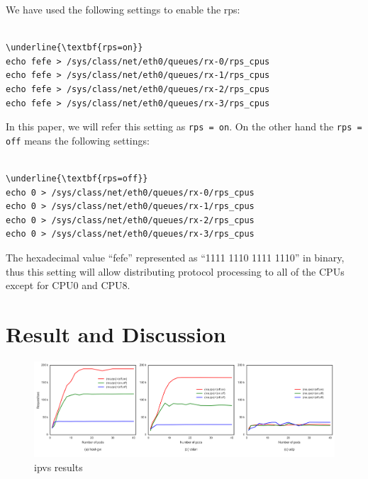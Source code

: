 We have used the following settings to enable the rps:

\begin{center}
\begin{minipage}{0.8\columnwidth}
\begin{Verbatim}[commandchars=\\\{\}]

\underline{\textbf{rps=on}}
echo fefe > /sys/class/net/eth0/queues/rx-0/rps_cpus
echo fefe > /sys/class/net/eth0/queues/rx-1/rps_cpus
echo fefe > /sys/class/net/eth0/queues/rx-2/rps_cpus
echo fefe > /sys/class/net/eth0/queues/rx-3/rps_cpus

\end{Verbatim}
\end{minipage}
\end{center}

In this paper, we will refer this setting as {\tt rps = on}.
On the other hand the {\tt rps = off} means the following settings:

\begin{center}
\begin{minipage}{0.8\columnwidth}
\begin{Verbatim}[commandchars=\\\{\}]

\underline{\textbf{rps=off}}
echo 0 > /sys/class/net/eth0/queues/rx-0/rps_cpus
echo 0 > /sys/class/net/eth0/queues/rx-1/rps_cpus
echo 0 > /sys/class/net/eth0/queues/rx-2/rps_cpus
echo 0 > /sys/class/net/eth0/queues/rx-3/rps_cpus

\end{Verbatim}
\end{minipage}
\end{center}

The hexadecimal value \enquote{fefe} represented as \enquote{1111 1110 1111 1110} in binary, 
thus this setting will allow distributing protocol processing to all of the CPUs except for CPU0 and CPU8.

\section{Result and Discussion}\label{Result and Discussion}

\begin{figure}
\includegraphics[width=\textwidth]{Figs/ipvs_3figs}
\caption{ipvs results}
\label{fig:ipvs3figs}
\end{figure}

